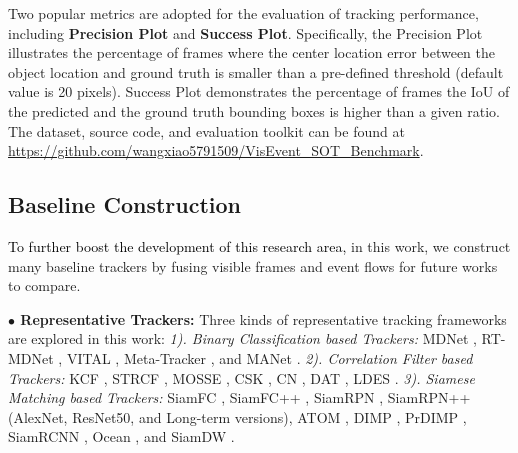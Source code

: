 \documentclass[journal]{IEEEtran}
\begin{document}
Two popular metrics are adopted for the evaluation of tracking performance, including \textbf{Precision Plot} and \textbf{Success Plot}. Specifically, the Precision Plot illustrates the percentage of frames where the center location error between the object location and ground truth is smaller than a pre-defined threshold (default value is 20 pixels). Success Plot demonstrates the percentage of frames the IoU of the predicted and the ground truth bounding boxes is higher than a given ratio. The dataset, source code, and evaluation toolkit can be found at \url{https://github.com/wangxiao5791509/VisEvent_SOT_Benchmark}. 




\subsection{Baseline Construction}  \label{baselineConst}

\textcolor{black}{To further boost the development of this research area,} in this work, we construct many baseline trackers by fusing visible frames and event flows for future works to compare. 


\textbf{$\bullet$ Representative Trackers: } 
Three kinds of representative tracking frameworks are explored in this work:  \emph{1). Binary Classification based Trackers:} 
MDNet \cite{Nam2015Learning}, RT-MDNet \cite{Jung_2018_ECCV}, VITAL \cite{song2018vital}, Meta-Tracker \cite{Park_2018_ECCV}, and MANet \cite{li2019MANet}. 
\emph{2). Correlation Filter based Trackers:} 
KCF \cite{Henriques2015High},  STRCF \cite{li2018STRCF},  MOSSE \cite{bolme2010MOSSE},   CSK \cite{henriques2012CSK},   CN \cite{danelljan2014CN},  DAT \cite{possegger2015DAT},   LDES \cite{li2019LDES}.    \emph{3). Siamese Matching based Trackers:} 
SiamFC \cite{bertinetto2016siamfc}, SiamFC++ \cite{xu2020siamfc++}, SiamRPN \cite{li2018siamRPN}, SiamRPN++ \cite{li2018siamrpn++} (AlexNet, ResNet50, and Long-term versions), ATOM \cite{danelljan2019atom}, DIMP \cite{bhat2019DiMP}, PrDIMP \cite{danelljan2020PRDiMP}, SiamRCNN \cite{voigtlaender2020siamRCNN}, Ocean \cite{zhang2020ocean}, and SiamDW \cite{siamdw2019}. 
\end{document}
